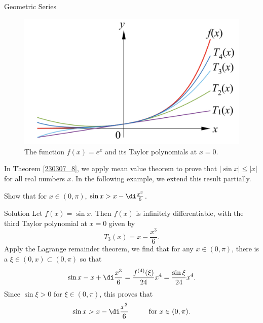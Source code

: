 \begin{example}[label=230305_16]{Geometric Series}
\begin{example}[label=230304_9]{}
\begin{example}{}
\begin{example}{}
\begin{figure}[ht]
\centering
\includegraphics[scale=0.2]{Picture59.png}
\caption{The function $f(x)=e^x$ and its Taylor polynomials at $x=0$.\fa}\label{figure59}
\end{figure}

In Theorem \ref{230307_8}, we apply  mean value theorem to prove that $|\sin x|\leq |x|$ for all real numbers $x$. In the following example, we extend this result partially.
\begin{example}{}
Show that
for $x\in (0, \pi)$,  $\sin x>x-\di\frac{x^3}{6}$.
\end{example}
\begin{solution}{Solution}
Let $f(x)=\sin x$. Then $f(x)$ is infinitely differentiable, with the third  Taylor polynomial at $x=0$ given by
\[ T_3(x)= x-\frac{x^3}{6}.\]
Apply the Lagrange remainder theorem, we find that for any $x\in (0,\pi)$, there is a $\xi \in (0,x)\subset (0,\pi)$ so that
\[\sin x-x+\di\frac{x^3}{6}=\frac{f^{(4)}(\xi)}{24}x^4=\frac{\sin \xi}{24}x^4.\] Since $\sin\xi>0$ for $\xi\in (0,\pi)$,
 this proves that \[\sin x>x-\di\frac{x^3}{6}\hspace{1cm}\text{for}\;x\in (0,\pi).\]
\end{solution}


\end{example}
\end{example}
\end{example}
\end{example}
